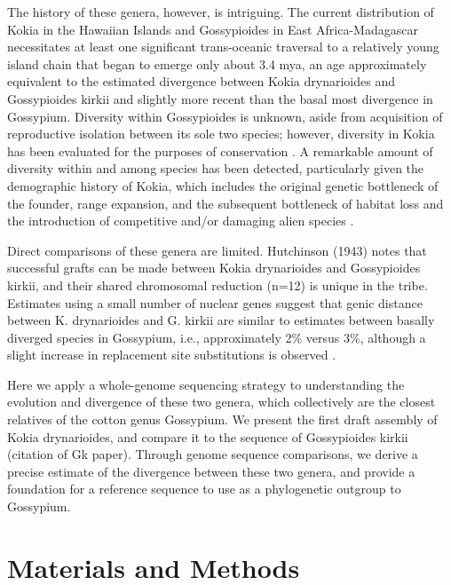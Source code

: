 \documentclass[10pt,letterpaper]{article}
\begin{document}
The history of these genera, however, is intriguing. The current distribution of
Kokia in the Hawaiian Islands and Gossypioides in East Africa-Madagascar
necessitates at least one significant trans-oceanic traversal to a relatively
young island chain that began to emerge only about 3.4 mya, an age approximately
equivalent to the estimated divergence between Kokia drynarioides and
Gossypioides kirkii \cite{Seelanan1997} and slightly more recent than the basal
most divergence in Gossypium. Diversity within Gossypioides is unknown, aside
from acquisition of reproductive isolation between its sole two species;
however, diversity in Kokia has been evaluated for the purposes of conservation
\cite{Sherwood2014}. A remarkable amount of diversity within and among species
has been detected, particularly given the demographic history of Kokia, which
includes the original genetic bottleneck of the founder, range expansion, and
the subsequent bottleneck of habitat loss and the introduction of competitive
and/or damaging alien species \cite{Sherwood2014}.

Direct comparisons of these genera are limited. Hutchinson (1943) notes that
successful grafts can be made between Kokia drynarioides and Gossypioides
kirkii, and their shared chromosomal reduction (n=12) is unique in the tribe.
Estimates using a small number of nuclear genes suggest that genic distance
between K. drynarioides and G. kirkii are similar to estimates between basally
diverged species in Gossypium, i.e., approximately 2\% versus 3\%, although a
slight increase in replacement site substitutions is observed \cite{Cronn2002}.                                

Here we apply a whole-genome sequencing strategy to understanding the evolution
and divergence of these two genera, which collectively are the closest relatives
of the cotton genus  Gossypium. We present the first draft assembly of Kokia
drynarioides, and compare it to the sequence of Gossypioides kirkii (citation of
Gk paper). Through genome sequence comparisons, we derive a precise estimate of
the divergence between these two genera, and provide a foundation for a
reference sequence to use as a phylogenetic outgroup to Gossypium.



\section*{Materials and Methods}
\end{document}
